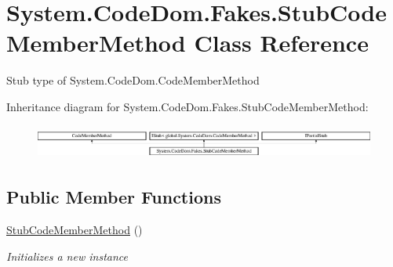 \hypertarget{class_system_1_1_code_dom_1_1_fakes_1_1_stub_code_member_method}{\section{System.\-Code\-Dom.\-Fakes.\-Stub\-Code\-Member\-Method Class Reference}
\label{class_system_1_1_code_dom_1_1_fakes_1_1_stub_code_member_method}
}


Stub type of System.\-Code\-Dom.\-Code\-Member\-Method 


Inheritance diagram for System.\-Code\-Dom.\-Fakes.\-Stub\-Code\-Member\-Method\-:\begin{figure}[H]
\begin{center}
\leavevmode
\includegraphics[height=1.127895cm]{class_system_1_1_code_dom_1_1_fakes_1_1_stub_code_member_method}
\end{center}
\end{figure}
\subsection*{Public Member Functions}
\begin{DoxyCompactItemize}
\item 
\hyperlink{class_system_1_1_code_dom_1_1_fakes_1_1_stub_code_member_method_af070815172203f5ded4799d7d9de0fab}{Stub\-Code\-Member\-Method} ()
\begin{DoxyCompactList}\small\item\em Initializes a new instance\end{DoxyCompactList}\end{DoxyCompactItemize}
